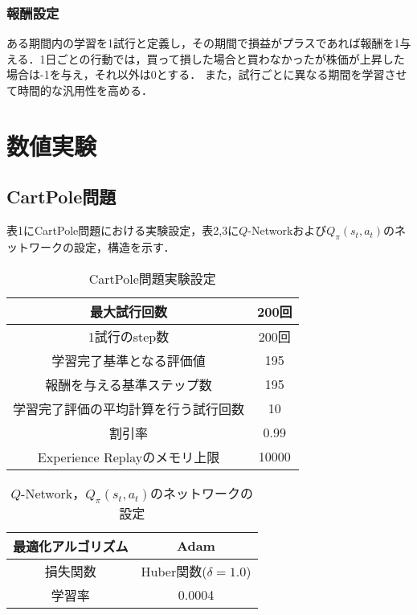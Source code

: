 \documentclass[twocolumn]{jarticle}
\begin{document}
        \subsubsection{報酬設定}
        ある期間内の学習を1試行と定義し，その期間で損益がプラスであれば報酬を1与える．1日ごとの行動では，買って損した場合と買わなかったが株価が上昇した場合は-1を与え，それ以外は0とする． また，試行ごとに異なる期間を学習させて時間的な汎用性を高める．

\section{数値実験}
        \subsection{CartPole問題}
        表1にCartPole問題における実験設定，表2,3に$Q$-Networkおよび$Q_\pi(s_t,a_t)$のネットワークの設定，構造を示す．

        \begin{table}
            \caption{CartPole問題実験設定}
            \begin{tabular}{|c|c|} \hline
                最大試行回数 & 200回 \\ \hline
                1試行のstep数 & 200回 \\ \hline
                学習完了基準となる評価値 & 195 \\ \hline
                報酬を与える基準ステップ数 & 195 \\ \hline
                学習完了評価の平均計算を行う試行回数 & 10 \\ \hline
                割引率 & 0.99 \\ \hline
                Experience Replayのメモリ上限 & 10000 \\ \hline
            \end{tabular}
        \end{table}

        \begin{table}
            \centering
            \caption{$Q$-Network，$Q_\pi(s_t,a_t)$のネットワークの設定}
            \begin{tabular}{|c|c|} \hline
                最適化アルゴリズム & Adam \\ \hline
                損失関数 & Huber関数($\delta=1.0$)\\ \hline %
                学習率 & 0.0004 \\ \hline
            \end{tabular}
        \end{table}
\end{document}
